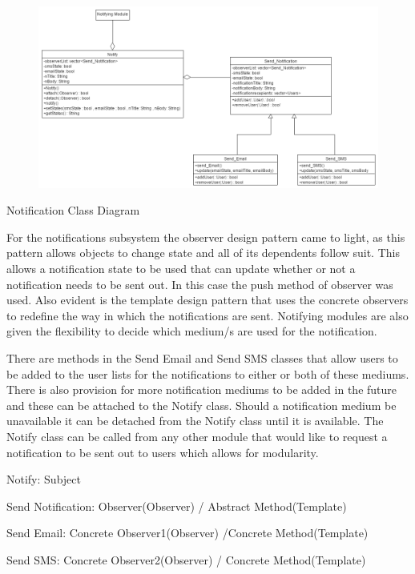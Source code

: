 \documentclass{article}
\begin{document}
    \begin{figure}[h!]
      \includegraphics[width=\textwidth]{Notifications_Class_Diagram.png}
    \end{figure}
    Notification Class Diagram
    
    \begin{flushleft}
    
        For the notifications subsystem the observer design pattern came to light, as this pattern allows objects to change state and all of its dependents follow suit. This allows a notification state to be used that can update whether or not a notification needs to be sent out. In this case the push method of observer was used. Also evident is the template design pattern that uses the concrete observers to redefine the way in which the notifications are sent. Notifying modules are also given the flexibility to decide which medium/s are used for the notification.
        
        \bigskip
        \newline
        
        There are methods in the Send Email and Send SMS classes that allow users to be added to the user lists for the notifications to either or both of these mediums. There is also provision for more notification mediums to be added in the future and these can be attached to the Notify class. Should a notification medium be unavailable it can be detached from the Notify class until it is available. The Notify class can be called from any other module that would like to request a notification to be sent out to users which allows for modularity.
        
        \bigskip
        \newline
        Notify: Subject
        
        \newline
        Send Notification: Observer(Observer) / Abstract Method(Template)
        
        \newline
        Send Email: Concrete Observer1(Observer) /Concrete Method(Template)
        
        \newline
        Send SMS: Concrete Observer2(Observer) / Concrete Method(Template)
    
    \end{flushleft}
    
\end{document}
